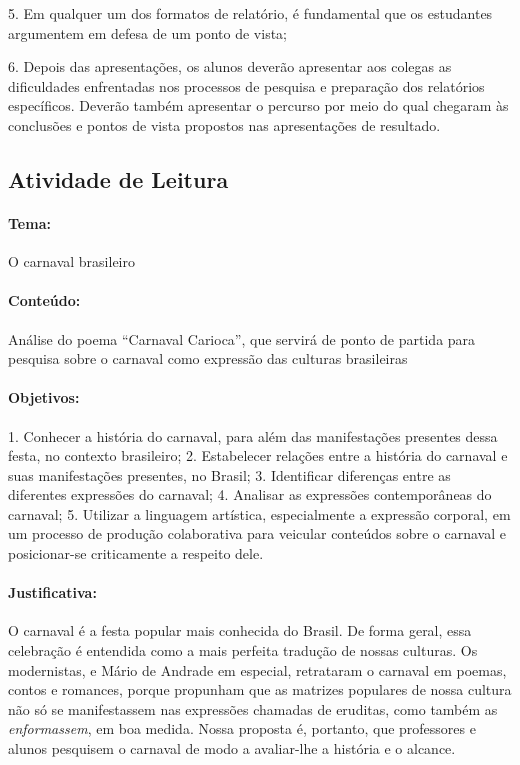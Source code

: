 \documentclass[11pt]{extarticle}
\begin{document}
5. Em qualquer um dos formatos de relatório, é fundamental que os
estudantes argumentem em defesa de um ponto de vista;

6. Depois das apresentações, os alunos deverão apresentar aos colegas as
dificuldades enfrentadas nos processos de pesquisa e preparação dos
relatórios específicos. Deverão também apresentar o percurso por meio do
qual chegaram às conclusões e pontos de vista propostos nas
apresentações de resultado.


\subsection{Atividade de Leitura}



\paragraph{Tema:} O carnaval brasileiro

\paragraph{Conteúdo:} Análise do poema ``Carnaval Carioca'', que servirá de
ponto de partida para pesquisa sobre o carnaval como expressão das
culturas brasileiras

\paragraph{Objetivos:} 1. Conhecer a história do carnaval, para além das
manifestações presentes dessa festa, no contexto brasileiro; 2.
Estabelecer relações entre a história do carnaval e suas manifestações
presentes, no Brasil; 3. Identificar diferenças entre as diferentes
expressões do carnaval; 4. Analisar as expressões contemporâneas do
carnaval; 5. Utilizar a linguagem artística, especialmente a expressão
corporal, em um processo de produção colaborativa para veicular
conteúdos sobre o carnaval e posicionar-se criticamente a respeito dele.

\paragraph{Justificativa:} O carnaval é a festa popular mais conhecida do
Brasil. De forma geral, essa celebração é entendida como a mais perfeita
tradução de nossas culturas. Os modernistas, e Mário de Andrade em
especial, retrataram o carnaval em poemas, contos e romances, porque
propunham que as matrizes populares de nossa cultura não só se
manifestassem nas expressões chamadas de eruditas, como também as
\emph{enformassem}, em boa medida. Nossa proposta é, portanto, que
professores e alunos pesquisem o carnaval de modo a avaliar-lhe a
história e o alcance.
\end{document}
